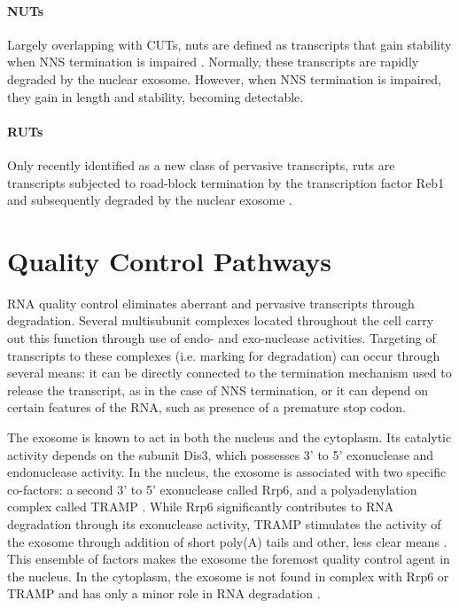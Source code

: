 \paragraph{NUTs}

Largely overlapping with CUTs, \gls{nuts} are defined as transcripts that gain stability when NNS termination is impaired \cite{schulz:2013:transcriptome}. 
Normally, these transcripts are rapidly degraded by the nuclear exosome. 
However, when NNS termination is impaired, they gain in length and stability, becoming detectable.

\paragraph{RUTs}

Only recently identified as a new class of pervasive transcripts, \gls{ruts} are transcripts subjected to road-block termination by the transcription factor Reb1 and subsequently degraded by the nuclear exosome \cite{colin:2014:roadblock}.

\section{Quality Control Pathways}

RNA quality control eliminates aberrant and pervasive transcripts through degradation. 
Several multisubunit complexes located throughout the cell carry out this function through use of endo- and exo-nuclease activities. 
Targeting of transcripts to these complexes (i.e. marking for degradation) can occur through several means: it can be directly connected to the termination mechanism used to release the transcript, as in the case of NNS termination, or it can depend on certain features of the RNA, such as presence of a premature stop codon.

The exosome is known to act in both the nucleus and the cytoplasm. 
Its catalytic activity depends on the subunit Dis3, which possesses 3' to 5' exonuclease and endonuclease activity. In the nucleus, the exosome is associated with two specific co-factors: a second 3' to 5' exonuclease called Rrp6, and a polyadenylation complex called TRAMP \cite{lacava:2005:rna}. 
While Rrp6 significantly contributes to RNA degradation through its exonuclease activity, TRAMP stimulates the activity of the exosome through addition of short poly(A) tails and other, less clear means \cite{haracska:2005:trf4,jia:2012:rna}. 
This ensemble of factors makes the exosome the foremost quality control agent in the nucleus. 
In the cytoplasm, the exosome is not found in complex with Rrp6 or TRAMP and has only a minor role in RNA degradation \cite[for review see][]{tudek:2015:noncoding}.


